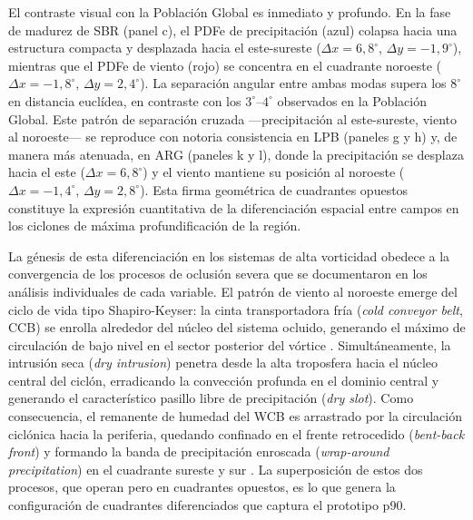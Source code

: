 El contraste visual con la Población Global es inmediato y profundo. En la fase de madurez de SBR (panel c), el PDFe de precipitación (azul) colapsa hacia una estructura compacta y desplazada hacia el este-sureste ($\Delta x = 6{,}8^{\circ}$, $\Delta y = -1{,}9^{\circ}$), mientras que el PDFe de viento (rojo) se concentra en el cuadrante noroeste ($\Delta x = -1{,}8^{\circ}$, $\Delta y = 2{,}4^{\circ}$). La separación angular entre ambas modas supera los $8^{\circ}$ en distancia euclídea, en contraste con los $3^{\circ}$--$4^{\circ}$ observados en la Población Global. Este patrón de separación cruzada —precipitación al este-sureste, viento al noroeste— se reproduce con notoria consistencia en LPB (paneles g y h) y, de manera más atenuada, en ARG (paneles k y l), donde la precipitación se desplaza hacia el este ($\Delta x = 6{,}8^{\circ}$) y el viento mantiene su posición al noroeste ($\Delta x = -1{,}4^{\circ}$, $\Delta y = 2{,}8^{\circ}$). Esta firma geométrica de cuadrantes opuestos constituye la expresión cuantitativa de la diferenciación espacial entre campos en los ciclones de máxima profundificación de la región.

La génesis de esta diferenciación en los sistemas de alta vorticidad obedece a la convergencia de los procesos de oclusión severa que se documentaron en los análisis individuales de cada variable. El patrón de viento al noroeste emerge del ciclo de vida tipo Shapiro-Keyser: la cinta transportadora fría (\textit{cold conveyor belt}, CCB) se enrolla alrededor del núcleo del sistema ocluido, generando el máximo de circulación de bajo nivel en el sector posterior del vórtice \citep{schultz2021antecedents}. Simultáneamente, la intrusión seca (\textit{dry intrusion}) penetra desde la alta troposfera hacia el núcleo central del ciclón, erradicando la convección profunda en el dominio central y generando el característico pasillo libre de precipitación (\textit{dry slot}). Como consecuencia, el remanente de humedad del WCB es arrastrado por la circulación ciclónica hacia la periferia, quedando confinado en el frente retrocedido (\textit{bent-back front}) y formando la banda de precipitación enroscada (\textit{wrap-around precipitation}) en el cuadrante sureste y sur \citep{martin1999forcing}. La superposición de estos dos procesos, que operan pero en cuadrantes opuestos, es lo que genera la configuración de cuadrantes diferenciados que captura el prototipo p90.

